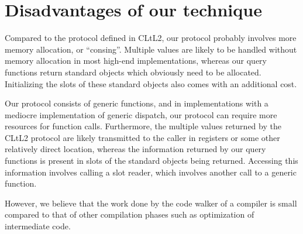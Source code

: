 \section{Disadvantages of our technique}

Compared to the protocol defined in CLtL2, our protocol probably
involves more memory allocation, or ``consing''.  Multiple values are
likely to be handled without memory allocation in most high-end
\commonlisp{} implementations, whereas our query functions return
standard objects which obviously need to be allocated.  Initializing
the slots of these standard objects also comes with an additional
cost.

Our protocol consists of generic functions, and in implementations
with a mediocre implementation of generic dispatch, our protocol can
require more resources for function calls.  Furthermore, the multiple
values returned by the CLtL2 protocol are likely transmitted to the
caller in registers or some other relatively direct location, whereas
the information returned by our query functions is present in slots of
the standard objects being returned.  Accessing this information
involves calling a slot reader, which involves another call to a
generic function.

However, we believe that the work done by the code walker of a
compiler is small compared to that of other compilation phases such as
optimization of intermediate code.
